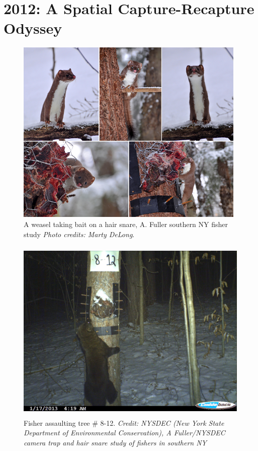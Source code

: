 \chapter{
2012: A Spatial Capture-Recapture Odyssey
}

\label{chapt.final}

\vspace{0.3cm}

\vspace{2in}



\begin{figure}[h!]
\centering
\includegraphics[height=3.5in]{Ch20-Last/Chp20picturearray.jpg}
\caption{
A weasel taking bait on a hair snare, A. Fuller southern NY fisher study
{\it Photo credits: Marty DeLong}.
}
\label{last.fig.weasels}
\end{figure}


\begin{figure}[h!]
\centering
\includegraphics[height=3.5in]{Ch20-Last/fisher.jpg}
\caption{
Fisher assaulting tree \# 8-12.
{\it Credit: NYSDEC (New York State Department of Environmental Conservation),
A Fuller/NYSDEC camera trap and hair snare study of fishers in
southern NY}
}
\label{last.fig.fisher}
\end{figure}


